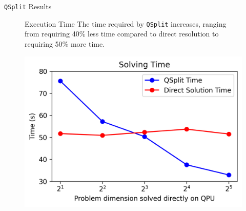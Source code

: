 \begin{block}{\texttt{QSplit} Results}
    \begin{figure}[h!]
        \centering
        \begin{minipage}{0.4\textwidth}
            \begin{alertblock}{Execution Time}
                The time required by \texttt{QSplit} increases, ranging from requiring 40\% less time compared to direct resolution to requiring 50\% more time.
            \end{alertblock}
        \end{minipage}%
        \hfill
        \begin{minipage}{0.55\textwidth}
            \centering
            \includegraphics[height=0.14\textheight]{logos/time.png}
        \end{minipage}
    \end{figure}
\end{block}